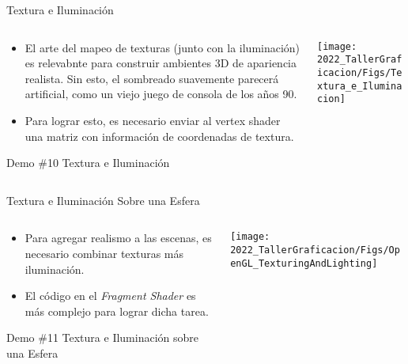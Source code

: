\begin{frame}{Textura e Iluminación}
\begin{columns}
\begin{column}{0.5\textwidth}
\begin{itemize}
\item El arte del mapeo de texturas (junto con la iluminación) es relevabnte para construir ambientes 3D de apariencia realista. Sin esto, el sombreado suavemente parecerá artificial, como un viejo juego de consola de los años 90.
\item Para lograr esto, es necesario enviar al vertex shader una matriz con información de coordenadas de textura. 
\end{itemize}
\begin{block}{Demo \#10}
Textura e Iluminación
\end{block}
\end{column}
\begin{column}{0.5\textwidth}
\begin{center}
 \texttt{[image: 2022\_TallerGraficacion/Figs/Textura\_e\_Iluminacion]}
\end{center}
\end{column}
\end{columns}

\end{frame}

\begin{frame}{Textura e Iluminación Sobre una Esfera}
\begin{columns}
\begin{column}{0.5\textwidth}
\begin{itemize}
\item Para agregar realismo a las escenas, es necesario combinar texturas más iluminación.
\item El código en el \textit{Fragment Shader} es más complejo para lograr dicha tarea. 
\end{itemize}
\begin{block}{Demo \#11}
Textura e Iluminación sobre una Esfera
\end{block}
\end{column}
\begin{column}{0.5\textwidth}
\begin{center}
 \texttt{[image: 2022\_TallerGraficacion/Figs/OpenGL\_TexturingAndLighting]}
\end{center}
\end{column}
\end{columns}

\end{frame}

